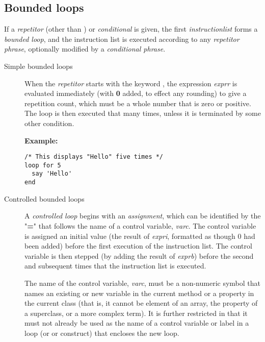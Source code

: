 \subsection{Bounded loops}
 If a \emph{repetitor} (other than ) or
\emph{conditional} is given, the first \emph{instructionlist}
forms a \emph{bounded loop}, and the instruction list is executed
according to any \emph{repetitor phrase}, optionally modified by a
\emph{conditional phrase}.
\begin{description}
\item[Simple bounded loops]

When the \emph{repetitor} starts with the keyword ,
the expression \emph{exprr} is evaluated immediately
(with \textbf{0} added, to effect any rounding) to give a repetition
count, which must be a whole number that is zero or positive.
The loop is then executed that many times, unless it is terminated by
some other condition.

\textbf{Example:}
\begin{lstlisting}
/* This displays "Hello" five times */
loop for 5
  say 'Hello'
end
\end{lstlisting}
\item[Controlled bounded loops]
A \emph{controlled loop} begins with an \emph{assignment},
which can be identified by the "\textbf{=}" that follows the name
of a control variable, \emph{varc}.
The control variable is assigned an initial value (the result of
\emph{expri}, formatted as though 0 had been added)
before the first execution of the instruction list.
The control variable is then stepped (by adding the result of
\emph{exprb}) before the second and subsequent times that the
instruction list is executed.
 
The name of the control variable, \emph{varc}, must be a non-numeric
symbol that names an existing or new variable in the current method or a
property in the current class (that is, it cannot be element of an
array, the property of a superclass, or a more complex term).  It is
further restricted in that it must not already be used as the name of a
control variable or label in a loop (or  or 
construct) that encloses the new loop.
 

\end{description}
